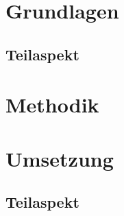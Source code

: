 \section{Grundlagen}


\subsection{Teilaspekt}



\section{Methodik}



\section{Umsetzung}


\subsection{Teilaspekt}

